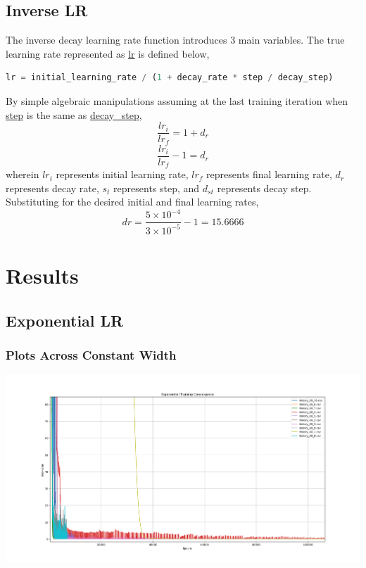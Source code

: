 \documentclass[a4paper, 12pt]{report}
\def\size{0.39}
\begin{document}
\begin{center}
\subsection{Inverse LR}

The inverse decay learning rate function introduces $3$ main variables. The true learning rate represented as \url{lr} is defined below,
\begin{lstlisting}[language=python]
lr = initial_learning_rate / (1 + decay_rate * step / decay_step)
\end{lstlisting}
By simple algebraic manipulations assuming at the last training iteration when \url{step} is the same as \url{decay_step},
$$\frac{lr_{i}}{lr_{f}} = 1 + d_{r}$$
$$\frac{lr_{i}}{lr_{f}} - 1 = d_{r}$$
wherein $lr_{i}$ represents initial learning rate, $lr_{f}$ represents final learning rate, $d_{r}$ represents decay rate, $s_{t}$ represents step, and $d_{st}$ represents decay step. Substituting for the desired initial and final learning rates, 
$$dr = \frac{5\times10^{-4}}{3\times10^{-5}} - 1 = 15.6666$$
\section{Results}

\subsection{Exponential LR}

\subsubsection{Plots Across Constant Width}

\includegraphics[scale=\size]{Expo_Cons_W.png}

\end{center}
\end{document}
